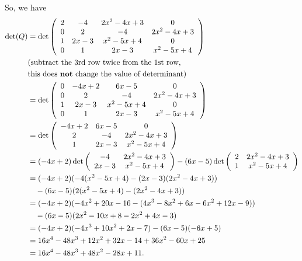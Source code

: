 \documentclass[
  course = {{16-811 Math Fundamentals for Robotics}},
  quartile = {{1}},
  assignment = 2,
  name = {{Kangle Deng}},
  email = {{kangled@andrew.cmu.edu}},
  firstexercise = 1
]{aga-homework}
\begin{document}
So, we have
\begin{equation*}
\begin{aligned}
    \det(Q) & = \det \left(
        \begin{array}{cccc}
        2 & -4 & 2x^2 - 4x + 3 & 0  \\
        0 & 2 & -4 & 2x^2 - 4x + 3  \\
        1 & 2x - 3 & x^2 - 5x + 4 & 0  \\
        0 & 1 & 2x - 3 & x^2 - 5x + 4  \\
    \end{array}
    \right) \\
    & (\text{subtract the 3rd row twice from the 1st row,} \\ & \text{this does \textbf{not} change the value of determinant}) \\
    & = \det \left(
        \begin{array}{cccc}
        0 & -4x+2 &  6x - 5 & 0  \\
        0 & 2 & -4 & 2x^2 - 4x + 3  \\
        1 & 2x - 3 & x^2 - 5x + 4 & 0  \\
        0 & 1 & 2x - 3 & x^2 - 5x + 4  \\
    \end{array}
    \right) \\
    & = \det \left(
        \begin{array}{ccc}
        -4x+2 &  6x - 5 & 0  \\
        2 & -4 & 2x^2 - 4x + 3  \\
        1 & 2x - 3 & x^2 - 5x + 4  \\
    \end{array}
    \right) \\
    & = (-4x+2) \det \left(
        \begin{array}{cc}
         -4 & 2x^2 - 4x + 3  \\
         2x - 3 & x^2 - 5x + 4  \\
    \end{array}
    \right)
    - (6x-5) \det \left(
        \begin{array}{cc}
         2 & 2x^2 - 4x + 3  \\
         1 & x^2 - 5x + 4  \\
    \end{array}
    \right)\\
    & = (-4x+2)(-4(x^2 - 5x + 4) - (2x - 3)(2x^2 - 4x + 3)) \\
     & \quad - (6x - 5)(2(x^2 - 5x + 4) - (2x^2 - 4x + 3)) \\
    & =(-4x+2)(-4x^2 + 20x - 16 - (4x^3 - 8x^2 + 6x - 6x^2 + 12x - 9)) \\
    & \quad - (6x - 5)(2x^2 - 10x + 8 - 2x^2 + 4x - 3) \\
    & = (-4x+2)(-4x^3+10x^2+2x-7) - (6x-5)(-6x+5) \\
    & = 16x^4 - 48x^3 + 12x^2 + 32x - 14 + 36x^2 - 60x + 25 \\
    & = 16x^4 - 48x^3 + 48x^2 - 28x + 11.
\end{aligned}

\end{equation*}
\end{document}
